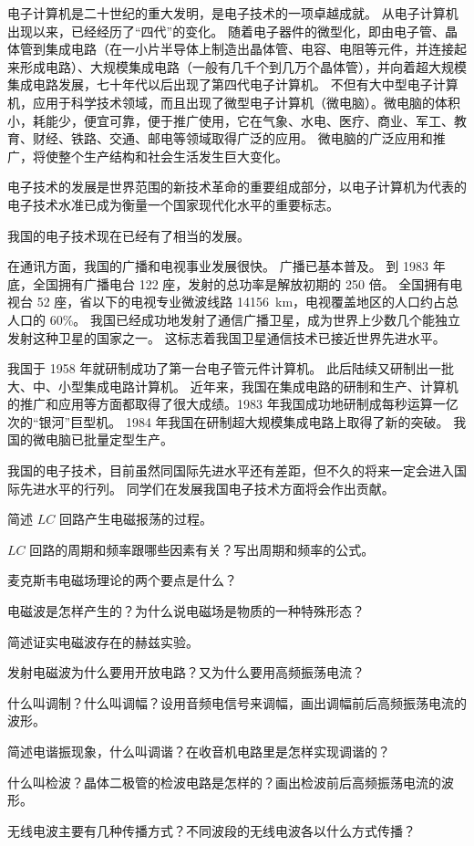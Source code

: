 电子计算机是二十世纪的重大发明，是电子技术的一项卓越成就。
从电子计算机出现以来，已经经历了“四代”的变化。
随着电子器件的微型化，即由电子管、晶体管到集成电路（在一小片半导体上制造出晶体管、电容、电阻等元件，并连接起来形成电路）、大规模集成电路（一般有几千个到几万个晶体管），并向着超大规模集成电路发展，七十年代以后出现了第四代电子计算机。
不但有大中型电子计算机，应用于科学技术领域，而且出现了微型电子计算机（微电脑）。微电脑的体积小，耗能少，便宜可靠，便于推广使用，它在气象、水电、医疗、商业、军工、教育、财经、铁路、交通、邮电等领域取得广泛的应用。
微电脑的广泛应用和推广，将使整个生产结构和社会生活发生巨大变化。

电子技术的发展是世界范围的新技术革命的重要组成部分，以电子计算机为代表的电子技术水准已成为衡量一个国家现代化水平的重要标志。

我国的电子技术现在已经有了相当的发展。

在通讯方面，我国的广播和电视事业发展很快。
广播已基本普及。
到 1983 年底，全国拥有广播电台 122 座，发射的总功率是解放初期的 250 倍。
全国拥有电视台 52 座，省以下的电视专业微波线路 \qty{14156}{km}，电视覆盖地区的人口约占总人口的 60\%。
我国已经成功地发射了通信广播卫星，成为世界上少数几个能独立发射这种卫星的国家之一。
这标志着我国卫星通信技术已接近世界先进水平。

我国于 1958 年就研制成功了第一台电子管元件计算机。
此后陆续又研制出一批大、中、小型集成电路计算机。
近年来，我国在集成电路的研制和生产、计算机的推广和应用等方面都取得了很大成绩。1983 年我国成功地研制成每秒运算一亿次的“银河”巨型机。
1984 年我国在研制超大规模集成电路上取得了新的突破。
我国的微电脑已批量定型生产。

我国的电子技术，目前虽然同国际先进水平还有差距，但不久的将来一定会进入国际先进水平的行列。
同学们在发展我国电子技术方面将会作出贡献。

\begin{Review}
\begin{question}
	\item 简述 $LC$ 回路产生电磁报荡的过程。
	\item $LC$ 回路的周期和频率跟哪些因素有关？写出周期和频率的公式。
	\item 麦克斯韦电磁场理论的两个要点是什么？
	\item 电磁波是怎样产生的？为什么说电磁场是物质的一种特殊形态？
	\item 简述证实电磁波存在的赫兹实验。
	\item 发射电磁波为什么要用开放电路？又为什么要用高频振荡电流？
	\item 什么叫调制？什么叫调幅？设用音频电信号来调幅，画出调幅前后高频振荡电流的波形。
	\item 简述电谐振现象，什么叫调谐？在收音机电路里是怎样实现调谐的？
	\item 什么叫检波？晶体二极管的检波电路是怎样的？画出检波前后高频振荡电流的波形。
	\item 无线电波主要有几种传播方式？不同波段的无线电波各以什么方式传播？
\end{question}
\end{Review}

